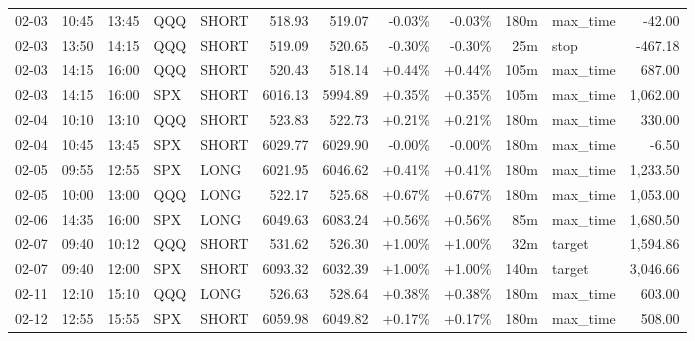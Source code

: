 \documentclass[11pt,a4paper,twoside]{article}
\begin{document}
\begin{center}
\begin{longtable}{>{\color{txtmain}}l l l l l r r r r r >{\color{txtmain}}l r}
02-03 & 10:45 & 13:45 & QQQ & SHORT & 518.93 & 519.07 & \textcolor{lossred}{-0.03\%} & \textcolor{lossred}{-0.03\%} & 180m & max\_time & \textcolor{lossred}{-42.00} \\
02-03 & 13:50 & 14:15 & QQQ & SHORT & 519.09 & 520.65 & \textcolor{lossred}{-0.30\%} & \textcolor{lossred}{-0.30\%} & 25m & stop & \textcolor{lossred}{-467.18} \\
02-03 & 14:15 & 16:00 & QQQ & SHORT & 520.43 & 518.14 & \textcolor{wingreen}{+0.44\%} & \textcolor{wingreen}{+0.44\%} & 105m & max\_time & \textcolor{wingreen}{687.00} \\
02-03 & 14:15 & 16:00 & SPX & SHORT & 6016.13 & 5994.89 & \textcolor{wingreen}{+0.35\%} & \textcolor{wingreen}{+0.35\%} & 105m & max\_time & \textcolor{wingreen}{1,062.00} \\
02-04 & 10:10 & 13:10 & QQQ & SHORT & 523.83 & 522.73 & \textcolor{wingreen}{+0.21\%} & \textcolor{wingreen}{+0.21\%} & 180m & max\_time & \textcolor{wingreen}{330.00} \\
02-04 & 10:45 & 13:45 & SPX & SHORT & 6029.77 & 6029.90 & \textcolor{lossred}{-0.00\%} & \textcolor{lossred}{-0.00\%} & 180m & max\_time & \textcolor{lossred}{-6.50} \\
02-05 & 09:55 & 12:55 & SPX & LONG & 6021.95 & 6046.62 & \textcolor{wingreen}{+0.41\%} & \textcolor{wingreen}{+0.41\%} & 180m & max\_time & \textcolor{wingreen}{1,233.50} \\
02-05 & 10:00 & 13:00 & QQQ & LONG & 522.17 & 525.68 & \textcolor{wingreen}{+0.67\%} & \textcolor{wingreen}{+0.67\%} & 180m & max\_time & \textcolor{wingreen}{1,053.00} \\
02-06 & 14:35 & 16:00 & SPX & LONG & 6049.63 & 6083.24 & \textcolor{wingreen}{+0.56\%} & \textcolor{wingreen}{+0.56\%} & 85m & max\_time & \textcolor{wingreen}{1,680.50} \\
02-07 & 09:40 & 10:12 & QQQ & SHORT & 531.62 & 526.30 & \textcolor{wingreen}{+1.00\%} & \textcolor{wingreen}{+1.00\%} & 32m & target & \textcolor{wingreen}{1,594.86} \\
02-07 & 09:40 & 12:00 & SPX & SHORT & 6093.32 & 6032.39 & \textcolor{wingreen}{+1.00\%} & \textcolor{wingreen}{+1.00\%} & 140m & target & \textcolor{wingreen}{3,046.66} \\
02-11 & 12:10 & 15:10 & QQQ & LONG & 526.63 & 528.64 & \textcolor{wingreen}{+0.38\%} & \textcolor{wingreen}{+0.38\%} & 180m & max\_time & \textcolor{wingreen}{603.00} \\
02-12 & 12:55 & 15:55 & SPX & SHORT & 6059.98 & 6049.82 & \textcolor{wingreen}{+0.17\%} & \textcolor{wingreen}{+0.17\%} & 180m & max\_time & \textcolor{wingreen}{508.00} \\

\end{longtable}
\end{center}
\end{document}
